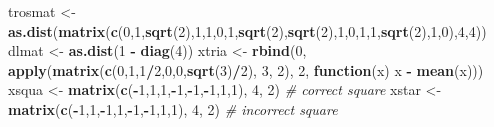 \documentclass[
  12pt,
]{article}
\newenvironment{Shaded}{\begin{snugshade}}{\end{snugshade}}
\newcommand{\CommentTok}[1]{\textcolor[rgb]{0.56,0.35,0.01}{\textit{#1}}}
\newcommand{\ControlFlowTok}[1]{\textcolor[rgb]{0.13,0.29,0.53}{\textbf{#1}}}
\newcommand{\DecValTok}[1]{\textcolor[rgb]{0.00,0.00,0.81}{#1}}
\newcommand{\FunctionTok}[1]{\textcolor[rgb]{0.13,0.29,0.53}{\textbf{#1}}}
\newcommand{\NormalTok}[1]{#1}
\newcommand{\OtherTok}[1]{\textcolor[rgb]{0.56,0.35,0.01}{#1}}
\newcommand{\SpecialCharTok}[1]{\textcolor[rgb]{0.81,0.36,0.00}{\textbf{#1}}}
\begin{document}
\begin{Shaded}
\begin{Highlighting}[]
\NormalTok{trosmat }\OtherTok{\textless{}{-}} \FunctionTok{as.dist}\NormalTok{(}\FunctionTok{matrix}\NormalTok{(}\FunctionTok{c}\NormalTok{(}\DecValTok{0}\NormalTok{,}\DecValTok{1}\NormalTok{,}\FunctionTok{sqrt}\NormalTok{(}\DecValTok{2}\NormalTok{),}\DecValTok{1}\NormalTok{,}\DecValTok{1}\NormalTok{,}\DecValTok{0}\NormalTok{,}\DecValTok{1}\NormalTok{,}\FunctionTok{sqrt}\NormalTok{(}\DecValTok{2}\NormalTok{),}\FunctionTok{sqrt}\NormalTok{(}\DecValTok{2}\NormalTok{),}\DecValTok{1}\NormalTok{,}\DecValTok{0}\NormalTok{,}\DecValTok{1}\NormalTok{,}\DecValTok{1}\NormalTok{,}\FunctionTok{sqrt}\NormalTok{(}\DecValTok{2}\NormalTok{),}\DecValTok{1}\NormalTok{,}\DecValTok{0}\NormalTok{),}\DecValTok{4}\NormalTok{,}\DecValTok{4}\NormalTok{))}
\NormalTok{dlmat }\OtherTok{\textless{}{-}} \FunctionTok{as.dist}\NormalTok{(}\DecValTok{1} \SpecialCharTok{{-}} \FunctionTok{diag}\NormalTok{(}\DecValTok{4}\NormalTok{))}
\NormalTok{xtria }\OtherTok{\textless{}{-}} \FunctionTok{rbind}\NormalTok{(}\DecValTok{0}\NormalTok{, }\FunctionTok{apply}\NormalTok{(}\FunctionTok{matrix}\NormalTok{(}\FunctionTok{c}\NormalTok{(}\DecValTok{0}\NormalTok{,}\DecValTok{1}\NormalTok{,}\DecValTok{1}\SpecialCharTok{/}\DecValTok{2}\NormalTok{,}\DecValTok{0}\NormalTok{,}\DecValTok{0}\NormalTok{,}\FunctionTok{sqrt}\NormalTok{(}\DecValTok{3}\NormalTok{)}\SpecialCharTok{/}\DecValTok{2}\NormalTok{), }\DecValTok{3}\NormalTok{, }\DecValTok{2}\NormalTok{), }\DecValTok{2}\NormalTok{, }\ControlFlowTok{function}\NormalTok{(x) x }\SpecialCharTok{{-}} \FunctionTok{mean}\NormalTok{(x)))}
\NormalTok{xsqua }\OtherTok{\textless{}{-}} \FunctionTok{matrix}\NormalTok{(}\FunctionTok{c}\NormalTok{(}\SpecialCharTok{{-}}\DecValTok{1}\NormalTok{,}\DecValTok{1}\NormalTok{,}\DecValTok{1}\NormalTok{,}\SpecialCharTok{{-}}\DecValTok{1}\NormalTok{,}\SpecialCharTok{{-}}\DecValTok{1}\NormalTok{,}\SpecialCharTok{{-}}\DecValTok{1}\NormalTok{,}\DecValTok{1}\NormalTok{,}\DecValTok{1}\NormalTok{), }\DecValTok{4}\NormalTok{, }\DecValTok{2}\NormalTok{) }\CommentTok{\# correct square}
\NormalTok{xstar }\OtherTok{\textless{}{-}} \FunctionTok{matrix}\NormalTok{(}\FunctionTok{c}\NormalTok{(}\SpecialCharTok{{-}}\DecValTok{1}\NormalTok{,}\DecValTok{1}\NormalTok{,}\SpecialCharTok{{-}}\DecValTok{1}\NormalTok{,}\DecValTok{1}\NormalTok{,}\SpecialCharTok{{-}}\DecValTok{1}\NormalTok{,}\SpecialCharTok{{-}}\DecValTok{1}\NormalTok{,}\DecValTok{1}\NormalTok{,}\DecValTok{1}\NormalTok{), }\DecValTok{4}\NormalTok{, }\DecValTok{2}\NormalTok{) }\CommentTok{\# incorrect square}
\end{Highlighting}
\end{Shaded}
\end{document}
